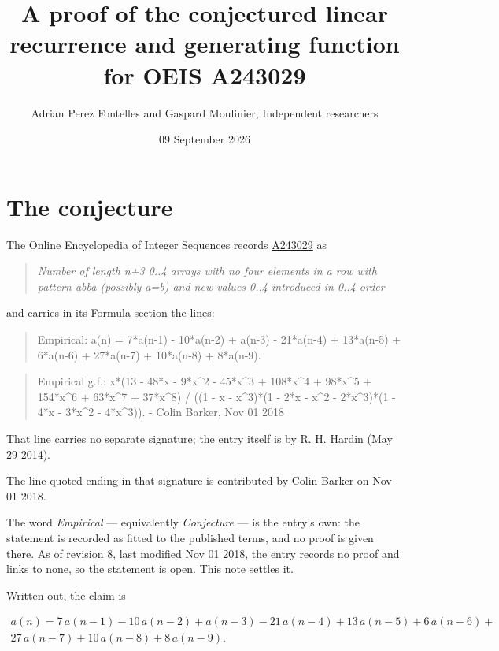 \documentclass[11pt]{article}
\title{A proof of the conjectured linear recurrence and generating function for OEIS A243029}
\author{Adrian Perez Fontelles and Gaspard Moulinier, Independent researchers}
\date{09 September 2026}
\theoremstyle{definition}
\begin{document}
\maketitle
\section{The conjecture}

The Online Encyclopedia of Integer Sequences records \href{https://oeis.org/A243029}{A243029} as

\begin{quote}\itshape Number of length n+3 0..4 arrays with no four elements in a row with pattern abba (possibly a=b) and new values 0..4 introduced in 0..4 order\end{quote}

and carries in its Formula section the lines:

\begin{quote}\ttfamily Empirical: a(n) = 7*a(n-1) - 10*a(n-2) + a(n-3) - 21*a(n-4) + 13*a(n-5) + 6*a(n-6) + 27*a(n-7) + 10*a(n-8) + 8*a(n-9).\end{quote}

\begin{quote}\ttfamily Empirical g.f.: x*(13 - 48*x - 9*x\textasciicircum{}2 - 45*x\textasciicircum{}3 + 108*x\textasciicircum{}4 + 98*x\textasciicircum{}5 + 154*x\textasciicircum{}6 + 63*x\textasciicircum{}7 + 37*x\textasciicircum{}8) / ((1 - x - x\textasciicircum{}3)*(1 - 2*x - x\textasciicircum{}2 - 2*x\textasciicircum{}3)*(1 - 4*x - 3*x\textasciicircum{}2 - 4*x\textasciicircum{}3)). - Colin Barker, Nov 01 2018\end{quote}

That line carries no separate signature; the entry itself is by R. H. Hardin (May 29 2014).

The line quoted ending in that signature is contributed by Colin Barker on Nov 01 2018.

The word {\itshape Empirical} --- equivalently {\itshape Conjecture} --- is the entry's own: the statement is recorded as fitted to the published terms, and no proof is given there. As of revision 8, last modified Nov 01 2018, the entry records no proof and links to none, so the statement is open. This note settles it.

Written out, the claim is

\begin{multline*} a(n) = 7\,a(n-1) - 10\,a(n-2) + a(n-3) - 21\,a(n-4) + 13\,a(n-5) + 6\,a(n-6) + \\ 27\,a(n-7) + 10\,a(n-8) + 8\,a(n-9). \end{multline*}
\end{document}
